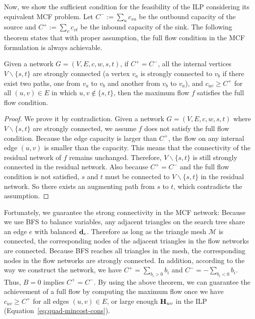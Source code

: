 Now, we show the sufficient condition for the feasibility of the ILP considering its equivalent MCF problem. Let $C^-:=\sum_u c_{su}$ be the outbound capacity of the source and $C^+:=\sum_v c_{vt}$ be the inbound capacity of the sink.  The following theorem states that with proper assumption, the full flow condition in the MCF formulation is always achievable.
\begin{theorem}
Given a network $G=(V, E, c, w, s, t)$, if $C^+=C^-$, all the internal vertices $V \backslash \{s,t\}$ are strongly connected (a vertex $v_a$ is strongly connected to $v_b$ if there exist two paths, one from $v_a$ to $v_b$ and another from $v_b$ to $v_a$), and $c_{uv} \ge C^+$ for all $(u,v) \in E$ in which $u,v \notin  \{s,t\}$, then the maximum flow $f$ satisfies the full flow condition.
\label{th:connect}
\end{theorem}

\begin{proof}
We prove it by contradiction. Given a network $G=(V, E, c, w, s, t)$ where $V \backslash \{s,t\}$ are strongly connected, we assume $f$ does not satisfy the full flow condition.  Because the edge capacity is larger than $C^+$, the flow on any internal edge $(u,v)$ is smaller than the capacity.  This means that the connectivity of the residual network of $f$ remains unchanged.  Therefore, $V \backslash \{s,t\}$ is still strongly connected in the residual network. Also because $C^+=C^-$ and the full flow condition is not satisfied, $s$ and $t$ must be connected to $V \backslash \{s,t\}$ in the residual network.  So there exists an augmenting path from $s$ to $t$, which contradicts the assumption.
\end{proof}

Fortunately, we guarantee the strong connectivity in the MCF network: Because we use BFS to balance variables, any adjacent triangles on the search tree share an edge $e$ with balanced ${\mathbf{d}}_e$. Therefore as long as the triangle mesh $\mathcal{M}$ is connected, the corresponding nodes of the adjacent triangles in the flow networks are connected. Because BFS reaches all triangles in the mesh, the corresponding nodes in the flow networks are strongly connected.  In addition, according to the way we construct the network, we have $C^+ = \sum_{b_i > 0}b_i$ and $C^- = -\sum_{b_i < 0} b_i$.  Thus, $B=0$ implies $C^+ = C^-$. By using the above theorem, we can guarantee the achievement of a full flow by computing the maximum flow once we have $c_{uv} \geq C^+$ for all edges $(u,v) \in E$, or large enough $\mathbf{H}_{uv}$ in the ILP (Equation~\ref{eq:quad-mincost-cons}).

